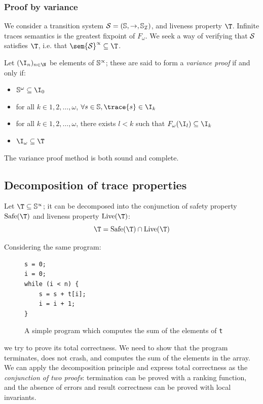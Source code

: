 \documentclass[toc]{../cs-classes/cs-classes}
\DeclareMathOperator{\safe}{Safe}
\DeclareMathOperator{\live}{Live}
\begin{document}
\subsubsection{Proof by variance}
We consider a transition system $\Sc = (\S, \to, \S_{\mathcal{I}})$, and liveness property $\T$. Infinite traces semantics is the greatest fixpoint of $F_\omega$. We seek a way of verifying that $\Sc$ satisfies $\T$, i.e. that $\sem{\Sc}^\propto \subseteq \T$.

\begin{definition}
    Let $(\I_n)_{n\in\N}$ be elements of $\S^\propto$; these are said to form a \emph{variance proof} if and only if:
    \begin{itemize}
        \item $\S^\omega\subseteq\I_0$
        \item for all $k\in{1, 2, \dots, \omega}$, $\forall s\in\S, \trace{s}\in\I_k$
        \item for all $k\in{1, 2, \dots, \omega}$, there exists $l<k$ such that $F_\omega(\I_l)\subseteq\I_k$
        \item $\I_\omega\subseteq\T$
    \end{itemize}
\end{definition}

\begin{theorem}
    The variance proof method is both sound and complete.
\end{theorem}

\subsection{Decomposition of trace properties}
\begin{theorem}
    Let $\T\subseteq \S^\propto$; it can be decomposed into the conjunction of safety property $\safe(\T)$ and liveness property $\live(\T)$:
    \begin{equation*}
        \T = \safe(\T) \cap \live(\T)
    \end{equation*}
\end{theorem}

\begin{example}
    Considering the same program:
    \begin{figure}[!ht]
        \centering 
        \begin{minipage}{0.2\textwidth}
            \begin{verbatim}
s = 0;
i = 0;
while (i < n) {
    s = s + t[i];
    i = i + 1;
}
            \end{verbatim}
        \end{minipage}
        \caption{A simple program which computes the sum of the elements of \texttt{t}}
    \end{figure}
    we try to prove its total correctness. We need to show that the program terminates, does not crash, and computes the sum of the elements in the array. We can apply the decomposition principle and express total correctness as the \emph{conjunction of two proofs}: termination can be proved with a ranking function, and the absence of errors and result correctness can be proved with local invariants.
\end{example}
\end{document}
